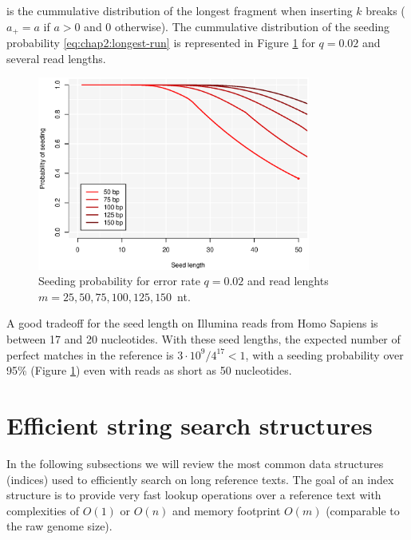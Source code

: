 is the cummulative distribution of the longest fragment when inserting
$k$ breaks ($a_+ = a$ if $a>0$ and $0$ otherwise). The cummulative
distribution of the seeding probability \eqref{eq:chap2:longest-run}
is represented in Figure \ref{fig:chap2:seedprob} for $q=0.02$ and
several read lengths.

\begin{figure}[h]
	\begin{minipage}[b]{\linewidth}
	  \centering
	  \includegraphics*[width=0.8\textwidth]{figures/chap2_seedprob}
	  \caption{Seeding probability for error rate $q=0.02$ and read
       lenghts $m=25,50,75,100,125,150$~nt.}
	  \label{fig:chap2:seedprob}
   \end{minipage}
\end{figure}

A good tradeoff for the seed length on Illumina reads from Homo
Sapiens is between 17 and 20 nucleotides. With these seed lengths, the
expected number of perfect matches in the reference is
$3\cdot10^9/4^{17} < 1$, with a seeding probability over 95\%
(Figure \ref{fig:chap2:seedprob}) even with reads as short as 50 nucleotides.

\section{Efficient string search structures}
\label{sec:chap2:index}
In the following subsections we will review the most common data
structures (indices) used to efficiently search on long reference
texts. The goal of an index structure is to provide very fast lookup
operations over a reference text with complexities of $O(1)$ or $O(n)$
and memory footprint $O(m)$ (comparable to the raw genome size).

